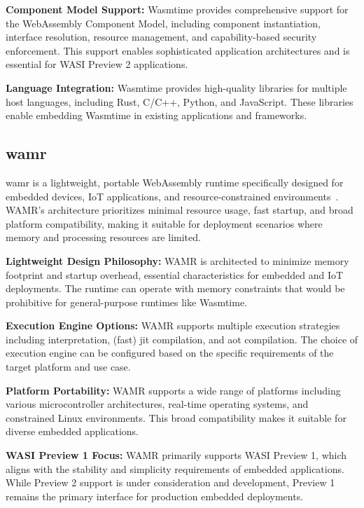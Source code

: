 \textbf{Component Model Support:} Wasmtime provides comprehensive support for the WebAssembly Component Model, including component instantiation, interface resolution, resource management, and capability-based security enforcement. This support enables sophisticated application architectures and is essential for WASI Preview 2 applications.

\textbf{Language Integration:} Wasmtime provides high-quality libraries for multiple host languages, including Rust, C/C++, Python, and JavaScript. These libraries enable embedding Wasmtime in existing applications and frameworks.

\subsection{\acrfull{wamr}}
\label{subsec:wamr}

\acrshort{wamr} is a lightweight, portable WebAssembly runtime specifically designed for embedded devices, IoT applications, and resource-constrained environments\cite{wamr_project}~\cite{wamr_project2}. WAMR's architecture prioritizes minimal resource usage, fast startup, and broad platform compatibility, making it suitable for deployment scenarios where memory and processing resources are limited.

\textbf{Lightweight Design Philosophy:} WAMR is architected to minimize memory footprint and startup overhead, essential characteristics for embedded and IoT deployments. The runtime can operate with memory constraints that would be prohibitive for general-purpose runtimes like Wasmtime.

\textbf{Execution Engine Options:} WAMR supports multiple execution strategies including interpretation, (fast) \acrshort{jit} compilation, and \acrshort{aot} compilation. The choice of execution engine can be configured based on the specific requirements of the target platform and use case.

\textbf{Platform Portability:} WAMR supports a wide range of platforms including various microcontroller architectures, real-time operating systems, and constrained Linux environments. This broad compatibility makes it suitable for diverse embedded applications.

\textbf{WASI Preview 1 Focus:} WAMR primarily supports WASI Preview 1, which aligns with the stability and simplicity requirements of embedded applications. While Preview 2 support is under consideration and development, Preview 1 remains the primary interface for production embedded deployments.

